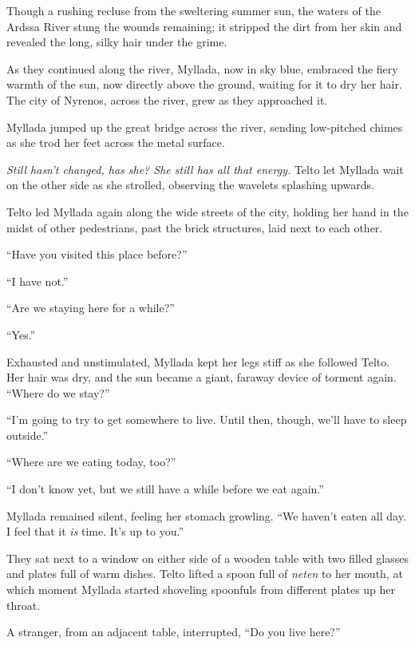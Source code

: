 Though a rushing recluse from the sweltering summer sun, the waters of the Ardssa River stung the wounds remaining; it stripped the dirt from her skin and revealed the long, silky hair under the grime.

\centeredstars

As they continued along the river, Myllada, now in sky blue, embraced the fiery warmth of the sun, now directly above the ground, waiting for it to dry her hair. The city of Nyrenos, across the river, grew as they approached it.

Myllada jumped up the great bridge across the river, sending low-pitched chimes as she trod her feet across the metal surface.

\emph{Still hasn't changed, has she? She still has all that energy.} Telto let Myllada wait on the other side as she strolled, observing the wavelets splashing upwards.

\centeredstars

Telto led Myllada again along the wide streets of the city, holding her hand in the midst of other pedestrians, past the brick structures, laid next to each other.

``Have you visited this place before?''

``I have not.''

``Are we staying here for a while?''

``Yes.''

Exhausted and unstimulated, Myllada kept her legs stiff as she followed Telto. Her hair was dry, and the sun became a giant, faraway device of torment again. ``Where do we stay?''

``I'm going to try to get somewhere to live. Until then, though, we'll have to sleep outside.''

``Where are we eating today, too?''

``I don't know yet, but we still have a while before we eat again.''

Myllada remained silent, feeling her stomach growling. ``We haven't eaten all day. I feel that it \emph{is} time. It's up to you.''

\centeredstars

They sat next to a window on either side of a wooden table with two filled glasses and plates full of warm dishes. Telto lifted a spoon full of \emph{neten} to her mouth, at which moment Myllada started shoveling spoonfuls from different plates up her throat.

A stranger, from an adjacent table, interrupted, ``Do you live here?''


